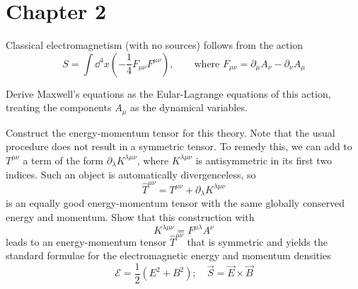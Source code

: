 \section{Chapter 2}

\setcounter{equation}{66}
\problem Classical electromagnetism (with no sources) follows from the action
\begin{equation}
    S = \int \dd^4 x \left(-\frac{1}{4} F_{\mu\nu} F^{\mu\nu} \right), 
    \qquad \text{where } F_{\mu\nu} = \partial_\mu A_\nu - \partial_\nu A_\mu
\end{equation}
\begin{problembody}
    \item Derive Maxwell's equations as the Eular-Lagrange equations of this action, treating the 
    components $A_\mu$ as the dynamical variables.
    \item Construct the energy-momentum tensor for this theory. Note that the usual procedure does
    not result in a symmetric tensor. To remedy this, we can add to $T^{\mu\nu}$ a term of the form 
    $\partial_\lambda K^{\lambda\mu\nu}$, where $K^{\lambda\mu\nu}$ is antisymmetric in its first two
    indices. Such an object is automatically divergenceless, so
    \begin{equation*}
        \widehat{T}^{\mu\nu} = T^{\mu\nu} + \partial_\lambda K^{\lambda\mu\nu}
    \end{equation*}
    is an equally good energy-momentum tensor with the same globally conserved energy and momentum. Show 
    that this construction with
    \begin{equation*}
        K^{\lambda\mu\nu} = F^{\mu\lambda} A^\nu
    \end{equation*}
    leads to an energy-momentum tensor $\widehat{T}^{\mu\nu}$ that is symmetric and yields the standard
    formulae for the electromagnetic energy and momentum densities
    \begin{equation*}
        \mathcal{E} = \frac{1}{2}(E^2 + B^2); \quad \vec{S} = \vec{E} \times \vec{B}
    \end{equation*}
\end{problembody}

